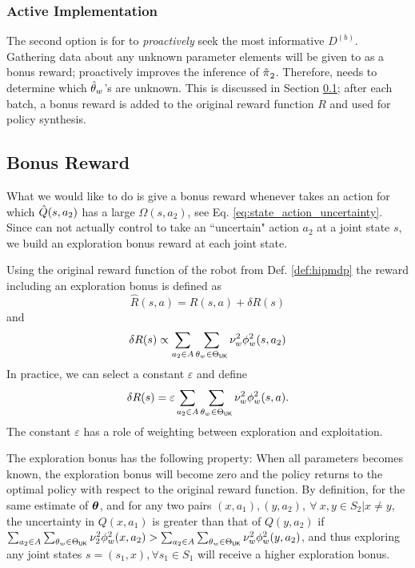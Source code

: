 \subsubsection{Active Implementation}
     The second option is for  to \textit{proactively} seek the most informative $D^{(b)}$.  Gathering data
     about any unknown parameter elements will be given to  as a bonus reward;  proactively improves
     the inference of $\hat{\pi_{}}_2$. Therefore,  needs to determine which
     $\hat{\theta}_{w}$\!'s are unknown. This is discussed in Section \ref{sec:bonus_reward}; after each
     batch, a bonus reward is added to the original reward function $R$ and used for policy synthesis.

\subsection{Bonus Reward}\label{sec:bonus_reward}

    What we would like to do is give  a bonus reward whenever  takes an action for which
    $\hat{Q}(s,a_2)$ has a large $\Omega(s,a_2)$, see Eq. \ref{eq:state_action_uncertainty}. Since  can
    not actually control  to take an ``uncertain" action $a_2$ at a joint state $s$, we build an exploration
    bonus reward at each joint state.

    Using the original reward function of the robot from Def. \ref{def:hipmdp} the reward including an exploration bonus
    is defined as
    \[
    \hat R (s,a) = R(s,a) + \delta R(s)
    \]
    and
    \[\delta R(s)  \propto \sum_{a_2\in A}\sum_{\theta_w\in \Theta_{\mathsf{UK}}} \nu_w^2 \phi^2_w(s,a_2)
    \]
    In practice, we can select a constant $\varepsilon$ and define
    \begin{equation}\label{eq:bonus_reward}
        \delta R(s) = \varepsilon \sum_{a_2\in A}\sum_{\theta_w\in \Theta_{\mathsf{UK}}} \nu_w^2 \phi_w^2(s,a).
    \end{equation}
    The constant $\varepsilon$ has a role of weighting between exploration and exploitation.

    \par
    The exploration bonus has the following property: When all parameters becomes known, the exploration bonus will
    become zero and the policy returns to the optimal policy with respect to the original reward function. By
    definition, for the same estimate of  $\boldsymbol{\mathbb{\theta}}$, and for any two pairs $(x,a_1), (y,a_2),\ \forall\ x,y\in S_2 | x
    \neq y$, the uncertainty in $Q(x,a_1)$ is greater than that of $Q(y,a_2)$ if $\sum_{a_2\in A}\sum_{\theta_w\in
    \Theta_{\mathsf{UK}}} \nu_2^2 \phi^2_w(x,a_2) > \sum_{a_2\in A}\sum_{\theta_w\in \Theta_{\mathsf{UK}}}  \nu_w^2
    \phi^2_w(y,a_2)  $, and thus exploring any joint states $s=(s_1,x), \forall s_1 \in S_1$ will receive a higher
    exploration bonus.


